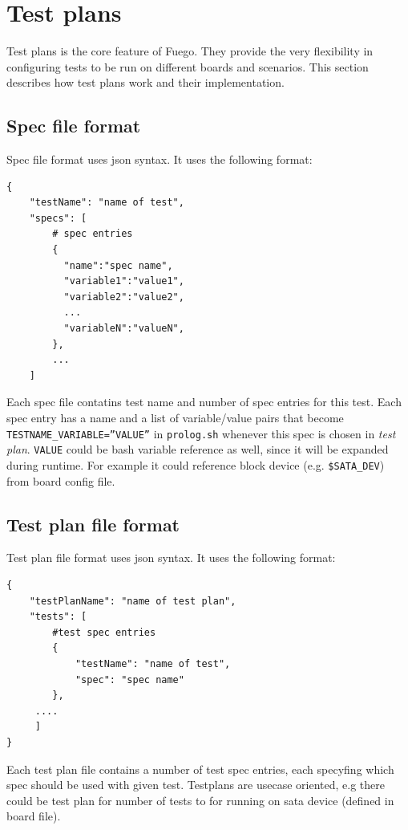 \section{Test plans}
\label{sec:testplans}

Test plans is the core feature of Fuego. They provide the very flexibility in configuring tests to be run on different boards and scenarios.
This section describes how test plans work and their implementation.

\subsection{Spec file format}
\label{sec:spec_fmt}
Spec file format uses json syntax. It uses the following format:
\begin{lstlisting}[label=spec_fmt, caption=Spec file format]
{
    "testName": "name of test",
    "specs": [
        # spec entries
        {
          "name":"spec name",
          "variable1":"value1",
          "variable2":"value2",
          ...
          "variableN":"valueN",
        },
        ...
    ]
  \end{lstlisting}

  Each spec file contatins test name and number of spec entries for this test.
  Each spec entry has a name and a list of variable/value pairs that become \texttt{TESTNAME\_VARIABLE=''VALUE''} in \texttt{prolog.sh} whenever this spec is chosen in \textit{test plan}. \texttt{VALUE} could be bash variable reference as well, since it will be expanded during runtime. For example it could reference block device (e.g. \texttt{\$SATA\_DEV}) from board config file.

\subsection{Test plan file format}
\label{sec:tp_fmt}
Test plan file format uses json syntax. It uses the following format:
\begin{lstlisting}[label=tp_fmt, caption=Test plan file format]
{
    "testPlanName": "name of test plan",
    "tests": [
        #test spec entries
        {
            "testName": "name of test",
            "spec": "spec name"
        },
     ....
     ]  
}
\end{lstlisting}

Each test plan file contains a number of test spec entries, each specyfing which spec should be used with given test. Testplans are usecase oriented, e.g there could be test plan for number of tests to for running on sata device (defined in board file).

